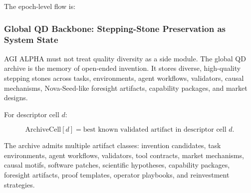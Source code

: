 The epoch-level flow is:

\begin{Shaded}
\begin{Highlighting}[]
\end{Highlighting}
\end{Shaded}

\subsubsection{Global QD Backbone: Stepping-Stone Preservation as System
State}\label{global-qd-backbone-stepping-stone-preservation-as-system-state}

AGI ALPHA must not treat quality diversity as a side module. The global
QD archive is the memory of open-ended invention. It stores diverse,
high-quality stepping stones across tasks, environments, agent
workflows, validators, causal mechanisms, Nova-Seed-like foresight
artifacts, capability packages, and market designs.

For descriptor cell \(d\):

\[
\mathrm{ArchiveCell}[d]
=
\text{best known validated artifact in descriptor cell } d.
\]

The archive admits multiple artifact classes: invention candidates, task
environments, agent workflows, validators, tool contracts, market
mechanisms, causal motifs, software patches, scientific hypotheses,
capability packages, foresight artifacts, proof templates, operator
playbooks, and reinvestment strategies.

